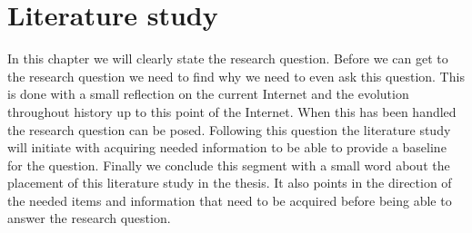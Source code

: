 \chapter{Literature study}

In this chapter we will clearly state the research question. Before we can get to the research question we need to find why we need to even ask this question. This is done with a small reflection on the current Internet and the evolution throughout history up to this point of the Internet. When this has been handled the research question can be posed. Following this question the literature study will initiate with acquiring needed information to be able to provide a baseline for the question. Finally we conclude this segment with a small word about the placement of this literature study in the thesis. It also points in the direction of the needed items and information that need to be acquired before being able to answer the research question.